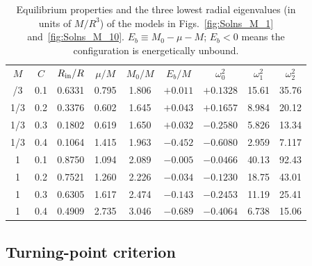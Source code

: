 \documentclass[%
 reprint,
 amsmath,amssymb,
 aps,prd,
 superscriptaddress,
]{revtex4-2}
\begin{document}
\begin{table}[htbp]
\caption{Equilibrium properties and the three lowest radial eigenvalues (in units of $M/R^3$) of the models in Figs.~\ref{fig:Solns_M_1} and~\ref{fig:Solns_M_10}. $E_b\equiv M_0-\mu-M$; $E_b<0$ means the configuration is energetically unbound.}
\label{tab:modes}
\begin{ruledtabular}
\begin{tabular}{ccccccccc}
$M$ & $C$ & $R_{\rm in}/R$ & $\mu/M$ & $M_0/M$ & $E_b/M$ & $\omega_0^2$ & $\omega_1^2$ & $\omega_2^2$ \\
\colrule
1/3 & 0.1 & 0.6331 & 0.795 & 1.806 & $+0.011$ & $+0.1328$ & 15.61 & 35.76 \\
1/3 & 0.2 & 0.3376 & 0.602 & 1.645 & $+0.043$ & $+0.1657$ & 8.984 & 20.12 \\
1/3 & 0.3 & 0.1802 & 0.619 & 1.650 & $+0.032$ & $-0.2580$ & 5.826 & 13.34 \\
1/3 & 0.4 & 0.1064 & 1.415 & 1.963 & $-0.452$ & $-0.6080$ & 2.959 & 7.117 \\
1 & 0.1 & 0.8750 & 1.094 & 2.089 & $-0.005$ & $-0.0466$ & 40.13 & 92.43 \\
1 & 0.2 & 0.7521 & 1.260 & 2.226 & $-0.034$ & $-0.1230$ & 18.75 & 43.01 \\
1 & 0.3 & 0.6305 & 1.617 & 2.474 & $-0.143$ & $-0.2453$ & 11.19 & 25.41 \\
1 & 0.4 & 0.4909 & 2.735 & 3.046 & $-0.689$ & $-0.4064$ & 6.738 & 15.06 \\
\end{tabular}
\end{ruledtabular}
\end{table}

\subsection{Turning-point criterion}
\end{document}
